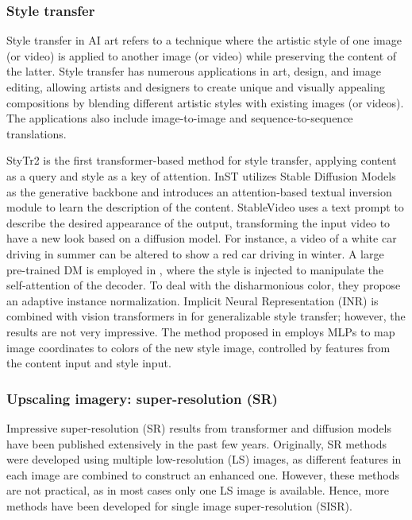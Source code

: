 \documentclass[11pt,a4paper]{article}
\begin{document}
\subsubsection{Style transfer}

Style transfer in AI art refers to a technique where the artistic style of one image (or video) is applied to another image (or video) while preserving the content of the latter. Style transfer has numerous applications in art, design, and image editing, allowing artists and designers to create unique and visually appealing compositions by blending different artistic styles with existing images (or videos). The applications also include image-to-image and sequence-to-sequence translations.

StyTr2 \cite{Deng:StyTr2:2022} is the first transformer-based method for style transfer, applying content as a query and style as a key of attention. InST \cite{Zhang:Inversion:2023} utilizes Stable Diffusion Models as the generative backbone and introduces an attention-based textual inversion module to learn the description of the content. StableVideo \cite{Chai:StableVideo:2023} uses a text prompt to describe the desired appearance of the output, transforming the input video to have a new look based on a diffusion model. For instance, a video of a white car driving in summer can be altered to show a red car driving in winter. A large pre-trained DM is employed in \cite{Chung_2024_CVPR}, where the style is injected to manipulate the self-attention of the decoder. To deal with the disharmonious color, they propose an adaptive instance normalization. Implicit Neural Representation (INR) is combined with vision transformers in \cite{Moon:generalizable:2023} for generalizable style transfer; however, the results are not very impressive. The method proposed in \cite{Kim:Controllable:2024} employs MLPs to map image coordinates to colors of the new style image, controlled by features from the content input and style input.


\subsubsection{Upscaling imagery: super-resolution (SR)}

Impressive super-resolution (SR) results from transformer and diffusion models have been published extensively in the past few years. Originally, SR methods were developed using multiple low-resolution (LS) images, as different features in each image are combined to construct an enhanced one. However, these methods are not practical, as in most cases only one LS image is available. Hence, more methods have been developed for single image super-resolution (SISR).
\end{document}
